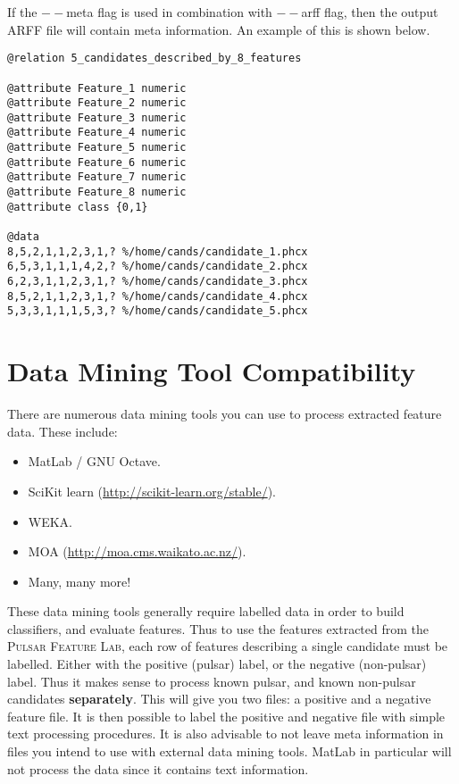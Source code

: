 \documentclass[twoside,a4paper]{refart}
\begin{document}
If the $--$meta flag is used in combination with $--$arff flag, then the output ARFF file will contain meta information. An example of this is shown below.
\begin{lstlisting}[caption={Feature data output in ARFF format with meta information.}]
@relation 5_candidates_described_by_8_features

@attribute Feature_1 numeric
@attribute Feature_2 numeric
@attribute Feature_3 numeric
@attribute Feature_4 numeric
@attribute Feature_5 numeric
@attribute Feature_6 numeric
@attribute Feature_7 numeric
@attribute Feature_8 numeric
@attribute class {0,1}

@data
8,5,2,1,1,2,3,1,? %/home/cands/candidate_1.phcx
6,5,3,1,1,1,4,2,? %/home/cands/candidate_2.phcx
6,2,3,1,1,2,3,1,? %/home/cands/candidate_3.phcx
8,5,2,1,1,2,3,1,? %/home/cands/candidate_4.phcx
5,3,3,1,1,1,5,3,? %/home/cands/candidate_5.phcx
\end{lstlisting}
\section{Data Mining Tool Compatibility}
There are numerous data mining tools you can use to process extracted feature data. These include:
\begin{itemize}
\item MatLab / GNU Octave.
\item SciKit learn (\url{http://scikit-learn.org/stable/}).
\item WEKA.
\item MOA (\url{http://moa.cms.waikato.ac.nz/}).
\item Many, many more!
\end{itemize}
These data mining tools generally require labelled data in order to build classifiers, and evaluate features. Thus to use the features extracted from the \textsc{Pulsar Feature Lab}, each row of features describing a single candidate must be labelled. Either with the positive (pulsar) label, or the negative (non-pulsar) label. Thus it makes sense to process known pulsar, and known non-pulsar candidates \textbf{separately}. This will give you two files: a positive and a negative feature file. It is then possible to label the positive and negative file with simple text processing procedures. It is also advisable to not leave meta information in files you intend to use with external data mining tools. MatLab in particular will not process the data since it contains text information.\newpage
\end{document}
